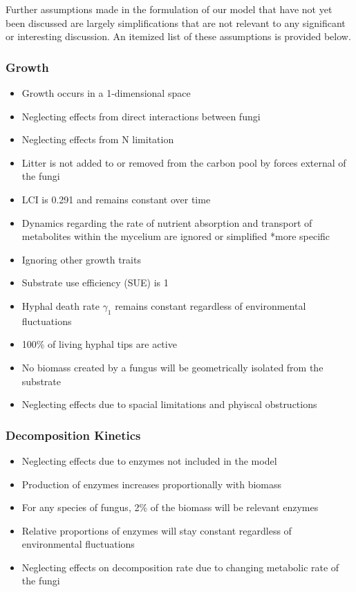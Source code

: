\documentclass[12pt]{article}
\begin{document}
\begin{multicols}{2}
Further assumptions made in the formulation of our model that have not yet been discussed are largely simplifications that are not relevant to any significant or interesting discussion. An itemized list of these assumptions is provided below.
\subsubsection{Growth}
\begin{itemize}
	\item Growth occurs in a 1-dimensional space
	\item Neglecting effects from direct interactions between fungi
	\item Neglecting effects from N limitation
	\item Litter is not added to or removed from the carbon pool by forces external of the fungi
	\item LCI is 0.291 and remains constant over time
	\item Dynamics regarding the rate of nutrient absorption and transport of metabolites within the
	mycelium are ignored or simplified *more specific
	\item Ignoring other growth traits
	\item Substrate use efficiency (SUE) is 1
	\item Hyphal death rate $\gamma_{1}$ remains constant regardless of environmental fluctuations
	\item 100\% of living hyphal tips are active
	\item No biomass created by a fungus will be geometrically isolated from the substrate
	\item Neglecting effects due to spacial limitations and phyiscal obstructions
\end{itemize}
\subsubsection{Decomposition Kinetics}
\begin{itemize}
	\item Neglecting effects due to enzymes not included in the model
	\item Production of enzymes increases proportionally with biomass
	\item For any species of fungus, 2\% of the biomass will be relevant enzymes
	\item Relative proportions of enzymes will stay constant regardless of environmental fluctuations
	\item Neglecting effects on decomposition rate due to changing metabolic rate of the fungi
\end{itemize}

\end{multicols}
\end{document}
